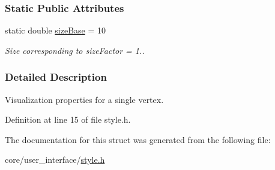 \subsubsection*{Static Public Attributes}
\begin{DoxyCompactItemize}
\item 
static double \hyperlink{structVertexStyle_a97102c363529ec2c01ee45653d23a3b0}{size\+Base} = 10\hypertarget{structVertexStyle_a97102c363529ec2c01ee45653d23a3b0}{}\label{structVertexStyle_a97102c363529ec2c01ee45653d23a3b0}

\begin{DoxyCompactList}\small\item\em Size corresponding to size\+Factor = 1.. \end{DoxyCompactList}\end{DoxyCompactItemize}


\subsubsection{Detailed Description}
Visualization properties for a single vertex. 

Definition at line 15 of file style.\+h.



The documentation for this struct was generated from the following file\+:\begin{DoxyCompactItemize}
\item 
core/user\+\_\+interface/\hyperlink{style_8h}{style.\+h}\end{DoxyCompactItemize}
